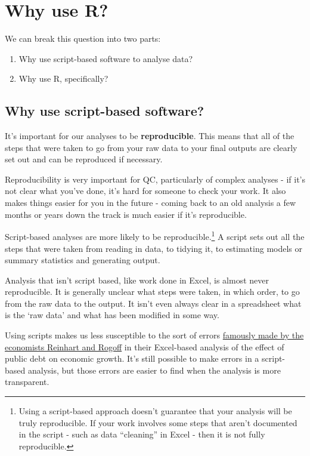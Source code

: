 \documentclass[]{book}
\providecommand{\tightlist}{%
  \setlength{\itemsep}{0pt}\setlength{\parskip}{0pt}}
\let\rmarkdownfootnote\footnote%
\def\footnote{\protect\rmarkdownfootnote}
\begin{document}
\hypertarget{why-use-r}{%
\chapter{Why use R?}\label{why-use-r}}

We can break this question into two parts:

\begin{enumerate}
\def\labelenumi{\arabic{enumi}.}
\tightlist
\item
  Why use script-based software to analyse data?
\item
  Why use R, specifically?
\end{enumerate}

\hypertarget{why-script}{%
\section{Why use script-based software?}\label{why-script}}

It's important for our analyses to be \textbf{reproducible}. This means that all of the steps that were taken to go from your raw data to your final outputs are clearly set out and can be reproduced if necessary.

Reproducibility is very important for QC, particularly of complex analyses - if it's not clear what you've done, it's hard for someone to check your work. It also makes things easier for you in the future - coming back to an old analysis a few months or years down the track is much easier if it's reproducible.

Script-based analyses are more likely to be reproducible.\footnote{Using a script-based approach doesn't guarantee that your analysis will be truly reproducible. If your work involves some steps that aren't documented in the script - such as data ``cleaning'' in Excel - then it is not fully reproducible.} A script sets out all the steps that were taken from reading in data, to tidying it, to estimating models or summary statistics and generating output.

Analysis that isn't script based, like work done in Excel, is almost never reproducible. It is generally unclear what steps were taken, in which order, to go from the raw data to the output. It isn't even always clear in a spreadsheet what is the `raw data' and what has been modified in some way.

Using scripts makes us less susceptible to the sort of errors \href{https://en.wikipedia.org/wiki/Growth_in_a_Time_of_Debt\#Methodological_flaws}{famously made by the economists Reinhart and Rogoff} in their Excel-based analysis of the effect of public debt on economic growth. It's still possible to make errors in a script-based analysis, but those errors are easier to find when the analysis is more transparent.
\end{document}
